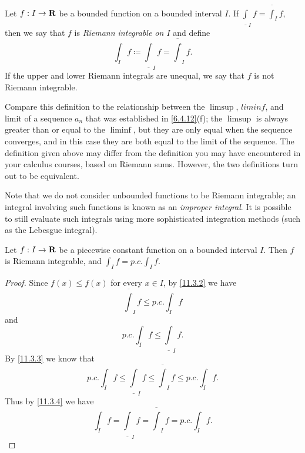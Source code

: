 \begin{definition}\label{11.3.4}
  Let \(f : I \to \mathbf{R}\) be a bounded function on a bounded interval \(I\).
  If \(\underline{\int}_I f = \overline{\int}_I f\), then we say that \(f\) is \emph{Riemann integrable on \(I\)} and define
  \[
    \int_I f \coloneqq \underline{\int}_I f = \overline{\int}_I f.
  \]
  If the upper and lower Riemann integrals are unequal, we say that \(f\) is not Riemann integrable.
\end{definition}

\begin{remark}\label{11.3.5}
  Compare this definition to the relationship between the \(\limsup\), \(liminf\), and limit of a sequence \(a_n\) that was established in \cref{6.4.12}(f);
  the \(\limsup\) is always greater than or equal to the \(\liminf\), but they are only equal when the sequence converges, and in this case they are both equal to the limit of the sequence.
  The definition given above may differ from the definition you may have encountered in your calculus courses, based on Riemann sums.
  However, the two definitions turn out to be equivalent.
\end{remark}

\begin{remark}\label{11.3.6}
  Note that we do not consider unbounded functions to be Riemann integrable;
  an integral involving such functions is known as an \emph{improper integral}.
  It is possible to still evaluate such integrals using more sophisticated integration methods (such as the Lebesgue integral).
\end{remark}

\begin{lemma}\label{11.3.7}
  Let \(f : I \to \mathbf{R}\) be a piecewise constant function on a bounded interval \(I\).
  Then \(f\) is Riemann integrable, and \(\int_I f = p.c. \int_I f\).
\end{lemma}

\begin{proof}
  Since \(f(x) \leq f(x)\) for every \(x \in I\), by \cref{11.3.2} we have
  \[
    \overline{\int}_I f \leq p.c. \int_I f
  \]
  and
  \[
    p.c. \int_I f \leq \underline{\int}_I f.
  \]
  By \cref{11.3.3} we know that
  \[
    p.c. \int_I f \leq \underline{\int}_I f \leq \overline{\int}_I f \leq p.c. \int_I f.
  \]
  Thus by \cref{11.3.4} we have
  \[
    \int_I f = \underline{\int}_I f = \overline{\int}_I f = p.c. \int_I f.
  \]
\end{proof}

